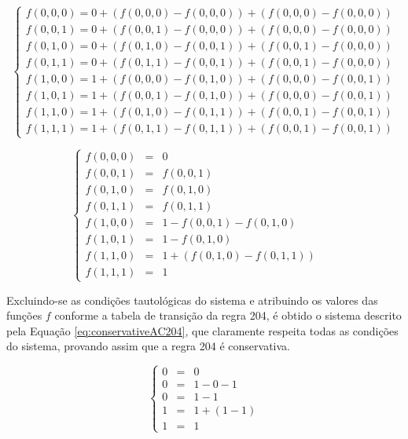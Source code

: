\documentclass[12pt,a4paper]{article}
\begin{document}
	\begin{equation}
	\left\{\begin{matrix}
	 f(0,0,0) = 0 + (f(0,0,0) - f(0,0,0)) + (f(0,0,0) - f(0,0,0))\\ 
	 f(0,0,1) = 0 + (f(0,0,1) - f(0,0,0)) + (f(0,0,0) - f(0,0,0))\\ 
	 f(0,1,0) = 0 + (f(0,1,0) - f(0,0,1)) + (f(0,0,1) - f(0,0,0))\\ 
	 f(0,1,1) = 0 + (f(0,1,1) - f(0,0,1)) + (f(0,0,1) - f(0,0,0))\\ 
	 f(1,0,0) = 1 + (f(0,0,0) - f(0,1,0)) + (f(0,0,0) - f(0,0,1))\\ 
	 f(1,0,1) = 1 + (f(0,0,1) - f(0,1,0)) + (f(0,0,0) - f(0,0,1))\\ 
	 f(1,1,0) = 1 + (f(0,1,0) - f(0,1,1)) + (f(0,0,1) - f(0,0,1))\\ 
	 f(1,1,1) = 1 + (f(0,1,1) - f(0,1,1)) + (f(0,0,1) - f(0,0,1))
	\end{matrix}\right.
	\label{eq:conservativeLinearSystem}
	\end{equation}

	\begin{equation}
	\left\{\begin{matrix}
	 f(0,0,0) & = & 0 		& &\\ 
	 f(0,0,1) & = & f(0,0,1)& & \\ 
	 f(0,1,0) & = & f(0,1,0)& & \\ 
	 f(0,1,1) & = & f(0,1,1)& & \\ 
	 f(1,0,0) & = & 1 - f(0,0,1) - f(0,1,0) \\ 
	 f(1,0,1) & = & 1 - f(0,1,0) \\ 
	 f(1,1,0) & = & 1 + (f(0,1,0) - f(0,1,1))\\ 
	 f(1,1,1) & = & 1 & &
	\end{matrix}\right.
	\label{eq:conservativeLinearSystem2}
	\end{equation}

	Excluindo-se as condições tautológicas do sistema e atribuindo os valores das funções $f$ conforme a tabela de transição da regra 204, é obtido o sistema descrito pela Equação \ref{eq:conservativeAC204}, que claramente respeita todas as condições do sistema, provando assim que a regra 204 é conservativa.

	\begin{equation}
	\left\{\begin{matrix}
	 0 & = & 0 \\ 
	 0 & = & 1 - 0 - 1 \\ 
	 0 & = & 1 - 1 \\ 
	 1 & = & 1 + (1 - 1)\\ 
	 1 & = & 1 
	\end{matrix}\right.
	\label{eq:conservativeAC204}
	\end{equation}
\end{document}
